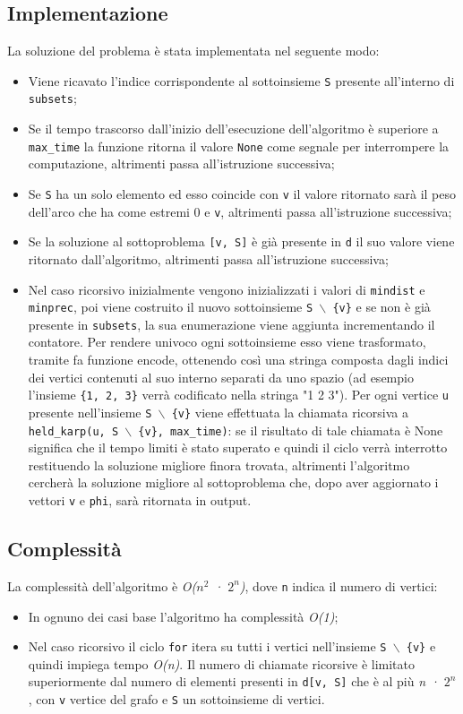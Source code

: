 \subsection{Implementazione}
La soluzione del problema è stata implementata nel seguente modo:
\begin{itemize}
	\item Viene ricavato l'indice corrispondente al sottoinsieme \texttt{S} presente all'interno di \texttt{subsets};
	\item Se il tempo trascorso dall'inizio dell'esecuzione dell'algoritmo è superiore a \texttt{max\_time} la funzione ritorna il valore \texttt{None} come segnale per interrompere la computazione, altrimenti passa all'istruzione successiva;
	\item Se \texttt{S} ha un solo elemento ed esso coincide con \texttt{v} il valore ritornato sarà il peso dell'arco che ha come estremi 0 e \texttt{v}, altrimenti passa all'istruzione successiva;
	\item Se la soluzione al sottoproblema \texttt{[v, S]} è già presente in \texttt{d} il suo valore viene ritornato dall'algoritmo, altrimenti passa all'istruzione successiva;
	\item Nel caso ricorsivo inizialmente vengono inizializzati i valori di \texttt{mindist} e \texttt{minprec}, poi viene costruito il nuovo sottoinsieme \texttt{S $\backslash$ \{v\}} e se non è già presente in \texttt{subsets}, la sua enumerazione viene aggiunta incrementando il contatore. Per rendere univoco ogni sottoinsieme esso viene trasformato, tramite fa funzione encode, ottenendo così una stringa composta dagli indici dei vertici contenuti al suo interno separati da uno spazio (ad esempio l'insieme \texttt{\{1, 2, 3\}} verrà codificato nella stringa "1 2 3"). Per ogni vertice \texttt{u} presente nell'insieme \texttt{S $\backslash$ \{v\}} viene effettuata la chiamata ricorsiva a \texttt{held\_karp(u, \texttt{S $\backslash$ \{v\}}, max\_time)}: se il risultato di tale chiamata è None significa che il tempo limiti è stato superato e quindi il ciclo verrà interrotto restituendo la soluzione migliore finora trovata, altrimenti l'algoritmo cercherà la soluzione migliore al sottoproblema che, dopo aver aggiornato i vettori \texttt{v} e \texttt{phi}, sarà ritornata in output.
\end{itemize}


\subsection{Complessità}
La complessità dell'algoritmo è \emph{O($n^2$ · $2^n$)}, dove \texttt{n} indica il numero di vertici:
\begin{itemize}
	\item In ognuno dei casi base l'algoritmo ha complessità \emph{O(1)};
	\item Nel caso ricorsivo il ciclo \texttt{for} itera su tutti i vertici nell'insieme \texttt{S $\backslash$ \{v\}} e quindi impiega tempo \emph{O(n)}. Il numero di chiamate ricorsive è limitato superiormente dal numero di elementi presenti in \texttt{d[v, S]} che è al più \emph{n · $2^n$}, con \texttt{v} vertice del grafo e \texttt{S} un sottoinsieme di vertici. 
\end{itemize}
\pagebreak